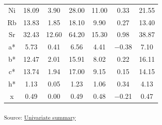 \documentclass[
  number]{elsarticle}
\begin{document}
\begin{longtable}[]{@{}ccccccc@{}}
Ni & 18.09 & 3.90 & 28.00 & 11.00 & 0.33 & 21.55 \\
Rb & 13.83 & 1.85 & 18.10 & 9.90 & 0.27 & 13.40 \\
Sr & 32.43 & 12.60 & 64.20 & 15.30 & 0.98 & 38.87 \\
a* & 5.73 & 0.41 & 6.56 & 4.41 & −0.38 & 7.10 \\
b* & 12.47 & 2.01 & 15.91 & 8.02 & 0.22 & 16.11 \\
c* & 13.74 & 1.94 & 17.00 & 9.15 & 0.15 & 14.15 \\
h* & 1.13 & 0.05 & 1.23 & 1.06 & 0.34 & 4.13 \\
x & 0.49 & 0.00 & 0.49 & 0.48 & −0.21 & 0.47 \\

\end{longtable}

\textsubscript{Source:
\href{https://alex-koiter.github.io/spatial-variability-soil-manuscript/notebooks/univariate_summary.qmd.html\#cell-tbl-univariate-summary}{Univariate
summary}}
\end{document}
